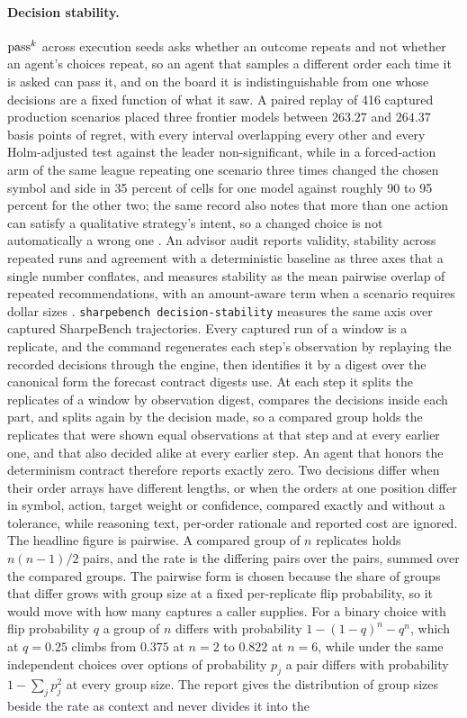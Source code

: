 \paragraph{Decision stability.} $\text{pass}^{k}$ across execution seeds asks whether an outcome repeats and not whether an agent's choices repeat, so an agent that samples a different order each time it is asked can pass it, and on the board it is indistinguishable from one whose decisions are a fixed function of what it saw. A paired replay of 416 captured production scenarios placed three frontier models between $263.27$ and $264.37$ basis points of regret, with every interval overlapping every other and every Holm-adjusted test against the leader non-significant, while in a forced-action arm of the same league repeating one scenario three times changed the chosen symbol and side in 35 percent of cells for one model against roughly 90 to 95 percent for the other two; the same record also notes that more than one action can satisfy a qualitative strategy's intent, so a changed choice is not automatically a wrong one \citep[p.~12]{barton2026production}. An advisor audit reports validity, stability across repeated runs and agreement with a deterministic baseline as three axes that a single number conflates, and measures stability as the mean pairwise overlap of repeated recommendations, with an amount-aware term when a scenario requires dollar sizes \citep[pp.~3--4]{barbieri2026auditing}. \texttt{sharpebench decision-stability} measures the same axis over captured SharpeBench trajectories. Every captured run of a window is a replicate, and the command regenerates each step's observation by replaying the recorded decisions through the engine, then identifies it by a digest over the canonical form the forecast contract digests use. At each step it splits the replicates of a window by observation digest, compares the decisions inside each part, and splits again by the decision made, so a compared group holds the replicates that were shown equal observations at that step and at every earlier one, and that also decided alike at every earlier step. An agent that honors the determinism contract therefore reports exactly zero. Two decisions differ when their order arrays have different lengths, or when the orders at one position differ in symbol, action, target weight or confidence, compared exactly and without a tolerance, while reasoning text, per-order rationale and reported cost are ignored. The headline figure is pairwise. A compared group of $n$ replicates holds $n(n-1)/2$ pairs, and the rate is the differing pairs over the pairs, summed over the compared groups. The pairwise form is chosen because the share of groups that differ grows with group size at a fixed per-replicate flip probability, so it would move with how many captures a caller supplies. For a binary choice with flip probability $q$ a group of $n$ differs with probability $1 - (1-q)^n - q^n$, which at $q = 0.25$ climbs from $0.375$ at $n = 2$ to $0.822$ at $n = 6$, while under the same independent choices over options of probability $p_j$ a pair differs with probability $1 - \sum_j p_j^2$ at every group size. The report gives the distribution of group sizes beside the rate as context and never divides it into the 